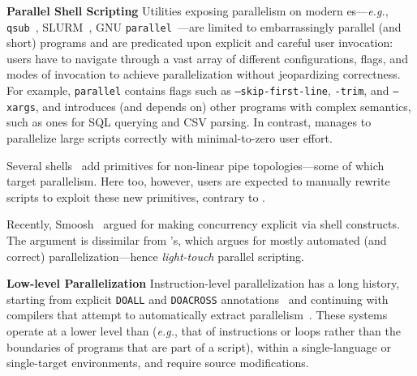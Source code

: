 \documentclass[letterpaper,twocolumn,10pt]{article}
\newcommand{\eg}{{\em e.g.}, }
\newcommand{\heading}[1]{\vspace{4pt}\noindent\textbf{#1}\enspace}
\newcommand{\ttt}[1]{\texttt{#1}}
\begin{document}
\heading{Parallel Shell Scripting}
Utilities exposing parallelism on modern \unix{}es---\eg \ttt{qsub}~\cite{gentzsch2001sun}, \textsc{SLURM}~\cite{yoo2003slurm}, \textsc{GNU} \ttt{parallel}~\cite{Tange2011a}---are limited to embarrassingly parallel (and short) programs and are predicated upon explicit and careful user invocation:
  users have to navigate through a vast array of different configurations, flags, and modes of invocation to achieve parallelization without jeopardizing correctness. %
For example, \ttt{parallel} contains flags such as \ttt{--skip-first-line}, \ttt{-trim}, and \ttt{--xargs},
and introduces (and depends on) other programs with complex semantics, such as ones for SQL querying and CSV parsing.
In contrast, \sys manages to parallelize large scripts correctly with minimal-to-zero user effort.

Several shells~\cite{duff1990rc, mcdonald1988support, dagsh:17} add primitives for non-linear pipe topologies---some of which target parallelism.
Here too, however, users are expected to manually rewrite scripts to exploit these new primitives, contrary to \sys.

Recently, Smoosh~\cite{smoosh:18} argued for making concurrency explicit via shell constructs.
The argument is dissimilar from \sys's, which argues for mostly automated (and correct) parallelization---hence \emph{light-touch} parallel scripting.


\heading{Low-level Parallelization}
Instruction-level parallelization has a long history, starting from explicit \ttt{DOALL} and \ttt{DOACROSS} annotations~\cite{par1, par2} and continuing with compilers that attempt to automatically extract parallelism~\cite{padua1993polaris,hall1996maximizing}.
These systems operate at a lower level than \sys (\eg that of instructions or loops rather than the boundaries of programs that are part of a script), within a single-language or single-target environments, and require source modifications.
\end{document}
